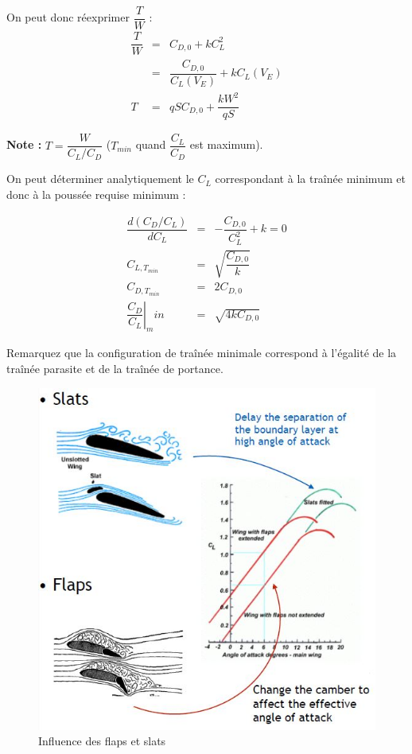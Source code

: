\documentclass{report}
\begin{document}
On peut donc réexprimer $\dfrac{T}{W}$ :
\begin{eqnarray}
\dfrac{T}{W} &= &C_{D,0}+kC_L^2\\
 &= &\dfrac{C_{D,0}}{C_L(V_E)}+kC_L(V_E)\\
T  &= &qSC_{D,0}+\dfrac{kW^2}{qS}
\end{eqnarray}


\textbf{Note :} $T=\dfrac{W}{C_L/C_D}$ ($T_{min}$ quand $\dfrac{C_L}{C_D}$ est maximum).

On peut déterminer analytiquement le $C_L$ correspondant à la traînée minimum et donc à la poussée requise minimum :

\begin{eqnarray}
\dfrac{d(C_D/C_L)}{dC_L} &= &-\dfrac{C_{D,0}}{C_L^2}+k=0\\
C_{L,T_{min}} &= &\sqrt{\dfrac{C_{D,0}}{k}}\\
C_{D,T_{min}} &= &2C_{D,0}\\
\left.\dfrac{C_D}{C_L}\right|_min &= &\sqrt{4kC_{D,0}}
\end{eqnarray}

Remarquez que la configuration de traînée minimale correspond à l’égalité de la traînée parasite et de la traînée de portance.

\begin{figure}[h!]
    \centering
    \includegraphics[scale=0.7]{6.JPG}
    \caption{Influence des flaps et slats}
    \label{6}
\end{figure}
\end{document}
